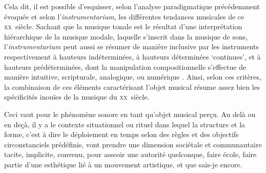 \documentclass{article}
\begin{document}
Cela dit, il est possible d'esquisser, selon l'analyse paradigmatique précédemment évoquée et selon l'\textit{instrumentarium}, les différentes tendances musicales de ce \textsc{xx}\ieme ~siècle.
 Sachant que la musique tonale est le résultat d'une interprétation hiérarchique de la musique modale, laquelle s'inscrit dans la musique de sons, l'\textit{instrumentarium} peut aussi se résumer de manière inclusive par les instruments respectivement  %
 à hauteurs indéterminées, à hauteurs déterminées `continues', et à hauteurs prédéterminées, 
 dont la manipulation compositionnelle s'effectue de manière intuitive, scripturale, analogique, ou numérique . 
 Ainsi, selon ces critères, la combinaison de ces éléments caractérisant l'objet musical résume assez bien les spécificités inouïes de la musique du \textsc{xx}\ieme ~siècle. 
 
 Ceci vaut pour le phénomène sonore en tant qu'objet musical perçu. Au delà ou en deçà, il y a  le contexte situationnel ou rituel dans lequel la structure et la forme, c'est à dire le déploiement en temps selon des règles et des objectifs circonstanciels prédéfinis, vont prendre une dimension sociétale et communautaire %
tacite, implicite, convenu, pour asseoir une autorité quelconque, faire école, faire partie d'une esthétique lié à un mouvement artistique, et que sais-je encore.
\end{document}
